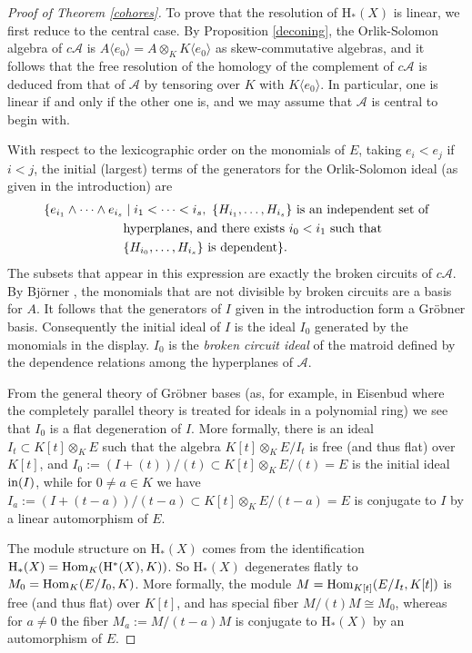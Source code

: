 \documentclass{tran-l}
\theoremstyle{definition}
\theoremstyle{remark}
\newcommand{\Acal}{{{\mathcal A}}}
\newcommand{\Hom}{\mathop{\rm Hom}\nolimits}
\newcommand{\rH}{{\mathrm H}}
\newcommand{\initial}{\mathop{\rm in }\nolimits}
\begin{document}
\begin{proof}[Proof of Theorem \ref{cohores}] To prove
that the resolution of $\rH_*(X)$ is linear, we first
reduce to the central case. By Proposition \ref{deconing},
the Orlik-Solomon algebra of $c\Acal$ is 
$A\langle e_0\rangle=A\otimes_KK\langle e_0\rangle$
as skew-commutative algebras, and it follows that the
free resolution of the homology of the complement of $c\Acal$
is deduced from that of $\Acal$ by tensoring over $K$ with
$K\langle e_0\rangle$. In particular, one is linear if and only if the
other one is, and we may assume that $\Acal$ is central to begin with.

With respect to
the lexicographic order on the monomials of $E$, taking
$e_i<e_j$ if $i<j$, the
initial (largest) terms of the generators for the Orlik-Solomon ideal (as
given in the introduction) are
\[
\begin{split} 
\{  
e_{i_1}\wedge\cdots\wedge e_{i_s} &\mid i_1<\dots <i_s,\ \{H_{i_1},
\dots,H_{i_s}\}
\hbox{ is an independent set of}\\
&\hbox{hyperplanes, and there exists $i_0<i_1$ such that }\\
                     &\{H_{i_0},\dots,H_{i_s}\} 
                        \hbox{ is dependent} \}. 
\end{split}
\]
The subsets
that appear in this expression are exactly the broken circuits
of $c\Acal$. By Bj\"orner \cite{Bjo1}, the monomials that are not
divisible by broken circuits are a basis for $A$. It follows that the
generators of $I$ given in the introduction form a Gr\"obner basis.
\pagebreak
Consequently the initial ideal of $I$ is the ideal $I_0$ generated by the
monomials in the display. $I_0$
is the {\it broken circuit ideal\/} of 
the matroid defined by the dependence relations among the hyperplanes
of $\Acal$. 

From the general theory of Gr\"obner bases (as, for example, 
in Eisenbud \cite{Ei} where the completely parallel theory is treated for
ideals in a polynomial ring) we see that $I_0$ is a flat degeneration
of $I$. More formally, there is an ideal 
$I_t\subset K[t]\otimes_K E$ 
such that the algebra 
$ K[t]\otimes_K E/I_t$ is free (and thus flat) over $ K[t]$, and
$I_0:=(I+(t))/(t)\subset  K[t]\otimes_K E/(t)=E$ 
is the initial ideal $\initial(I)$, while for $0\neq a\in  K$ we have
$I_a:=(I+(t-a))/(t-a)\subset  K[t]\otimes_K E/(t-a)=E$
is conjugate to $I$ by a linear automorphism of $E$.

The module structure on $\rH_*(X)$ comes
from the identification $\rH_*(X)=
\linebreak  
\Hom_K(\rH^*(X), K))$.
So $\rH_*(X)$ degenerates flatly to
$M_0=\Hom_K(E/I_0,  K)$. More formally, the module
$M=\Hom_{ K[t]}(E/I_t,  K[t])$ is free (and thus flat)
over $ K[t]$, and has special fiber $M/(t)M\cong M_0$,
whereas for $a\neq 0$ the fiber $M_a:=M/(t-a)M$ is conjugate to 
$\rH_*(X)$ by an automorphism of $E$.


\end{proof}
\end{document}
